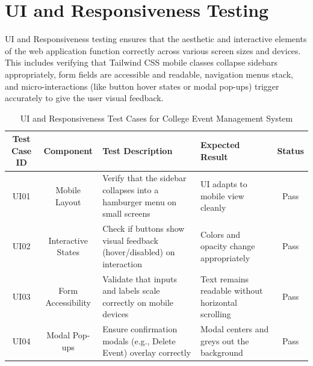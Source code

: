 \section{UI and Responsiveness Testing}
UI and Responsiveness testing ensures that the aesthetic and interactive elements of the web application function correctly across various screen sizes and devices. This includes verifying that Tailwind CSS mobile classes collapse sidebars appropriately, form fields are accessible and readable, navigation menus stack, and micro-interactions (like button hover states or modal pop-ups) trigger accurately to give the user visual feedback.
\begin{table}[H]
    \centering
    \renewcommand{\arraystretch}{1.3}
    \small
    \begin{tabular}{|c|c|p{3cm}|p{3cm}|c|}
        \hline
        \textbf{Test Case ID} & \textbf{Component} & \textbf{Test Description} & \textbf{Expected Result} & \textbf{Status} \\
        \hline
        UI01 & Mobile Layout & \raggedright Verify that the sidebar collapses into a hamburger menu on small screens & \raggedright UI adapts to mobile view cleanly & Pass \\
        \hline
        UI02 & Interactive States & \raggedright Check if buttons show visual feedback (hover/disabled) on interaction & \raggedright Colors and opacity change appropriately & Pass \\
        \hline
        UI03 & Form Accessibility & \raggedright Validate that inputs and labels scale correctly on mobile devices & \raggedright Text remains readable without horizontal scrolling & Pass \\
        \hline
        UI04 & Modal Pop-ups & \raggedright Ensure confirmation modals (e.g., Delete Event) overlay correctly & \raggedright Modal centers and greys out the background & Pass \\
        \hline
    \end{tabular}
    \caption{UI and Responsiveness Test Cases for College Event Management System}
    \label{tab:ui_media_tests}
\end{table}

\newpage
